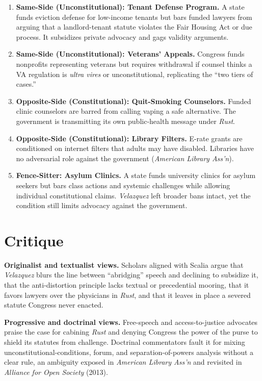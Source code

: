 \documentclass[12pt]{article}
\begin{document}
\begin{enumerate}
\item \textbf{Same-Side (Unconstitutional): Tenant Defense Program.} A state funds eviction defense for low-income tenants but bars funded lawyers from arguing that a landlord-tenant statute violates the Fair Housing Act or due process. It subsidizes private advocacy and gags validity arguments.
\item \textbf{Same-Side (Unconstitutional): Veterans' Appeals.} Congress funds nonprofits representing veterans but requires withdrawal if counsel thinks a VA regulation is \textit{ultra vires} or unconstitutional, replicating the ``two tiers of cases.''
\item \textbf{Opposite-Side (Constitutional): Quit-Smoking Counselors.} Funded clinic counselors are barred from calling vaping a safe alternative. The government is transmitting its own public-health message under \textit{Rust}.
\item \textbf{Opposite-Side (Constitutional): Library Filters.} E-rate grants are conditioned on internet filters that adults may have disabled. Libraries have no adversarial role against the government (\textit{American Library Ass'n}).
\item \textbf{Fence-Sitter: Asylum Clinics.} A state funds university clinics for asylum seekers but bars class actions and systemic challenges while allowing individual constitutional claims. \textit{Velazquez} left broader bans intact, yet the condition still limits advocacy against the government.
\end{enumerate}

\section{Critique}

\textbf{Originalist and textualist views.} Scholars aligned with Scalia argue that \textit{Velazquez} blurs the line between ``abridging'' speech and declining to subsidize it, that the anti-distortion principle lacks textual or precedential mooring, that it favors lawyers over the physicians in \textit{Rust}, and that it leaves in place a severed statute Congress never enacted.

\textbf{Progressive and doctrinal views.} Free-speech and access-to-justice advocates praise the case for cabining \textit{Rust} and denying Congress the power of the purse to shield its statutes from challenge. Doctrinal commentators fault it for mixing unconstitutional-conditions, forum, and separation-of-powers analysis without a clear rule, an ambiguity exposed in \textit{American Library Ass'n} and revisited in \textit{Alliance for Open Society} (2013).
\end{document}
